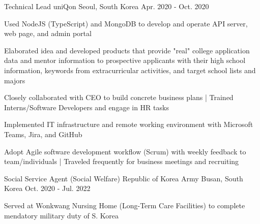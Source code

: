 

\begin{cventries}

  \cventry
  {Technical Lead} %
  {uniQon} %
  {Seoul, South Korea} %
  {Apr. 2020 - Oct. 2020} %
  {
    \begin{cvitems} %
      \item {Used NodeJS (TypeScript) and MongoDB to develop and operate API server, web page, and admin portal}
      \item {Elaborated idea and developed products that provide "real" college application data and mentor information to prospective applicants with their high school information, keywords from extracurricular activities, and target school lists and majors}
      \item {Closely collaborated with CEO to build concrete business plans | Trained Interns/Software Developers and engage in HR tasks}
      \item {Implemented IT infrastructure and remote working environment with Microsoft Teams, Jira, and GitHub}
      \item {Adopt Agile software development workflow (Scrum) with weekly feedback to team/individuals | Traveled frequently for business meetings and recruiting}
    \end{cvitems}
  }

  \cventry
  {Social Service Agent (Social Welfare)} %
  {Republic of Korea Army} %
  {Busan, South Korea} %
  {Oct. 2020 - Jul. 2022} %
  {
    \begin{cvitems} %
      \item {Served at Wonkwang Nursing Home (Long-Term Care Facilities) to complete mendatory military duty of S. Korea}
    \end{cvitems}
  }


\end{cventries}
